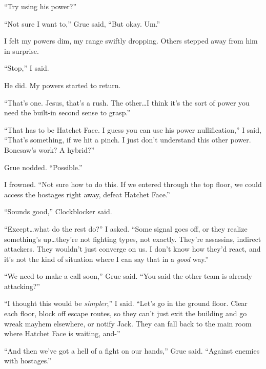 ``Try using his power?''



``Not sure I want to,'' Grue said, ``But okay.  Um.''



I felt my powers dim, my range swiftly dropping.  Others stepped away from him in surprise.



``Stop,'' I said.



He did.  My powers started to return.



``That's one.  Jesus, that's a rush.  The other\ldots I think it's the sort of power you need the built-in second sense to grasp.''



``That has to be Hatchet Face.  I guess you can use his power nullification,'' I said, ``That's something, if we hit a pinch.  I just don't understand this other power.  Bonesaw's work?  A hybrid?''



Grue nodded.  ``Possible.''



I frowned.  ``Not sure how to do this.  If we entered through the top floor, we could access the hostages right away, defeat Hatchet Face.''



``Sounds good,'' Clockblocker said.



``Except\ldots what do the rest do?'' I asked.  ``Some signal goes off, or they realize something's up\ldots they're not fighting types, not exactly.  They're assassins, indirect attackers.  They wouldn't just converge on us.  I don't know how they'd react, and it's not the kind of situation where I can say that in a \emph{good} way.''



``We need to make a call soon,'' Grue said.  ``You said the other team is already attacking?''



``I thought this would be \emph{simpler},'' I said.  ``Let's go in the ground floor.  Clear each floor, block off escape routes, so they can't just exit the building and go wreak mayhem elsewhere, or notify Jack.  They can fall back to the main room where Hatchet Face is waiting, and-''



``And then we've got a hell of a fight on our hands,'' Grue said.  ``Against enemies with hostages.''




